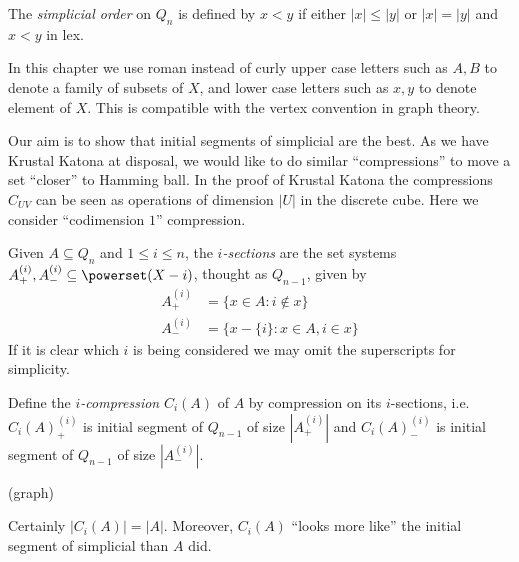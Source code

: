 \documentclass[a4paper]{article}
\begin{document}
\begin{definition}
  The \emph{simplicial order} on \(Q_n\) is defined by \(x < y\) if either \(|x| \leq |y|\) or \(|x| = |y|\) and \(x < y\) in lex.
\end{definition}

\begin{notation}
  In this chapter we use roman instead of curly upper case letters such as \(A, B\) to denote a family of subsets of \(X\), and lower case letters such as \(x, y\) to denote element of \(X\). This is compatible with the vertex convention in graph theory.
\end{notation}

Our aim is to show that initial segments of simplicial are the best. As we have Krustal Katona at disposal, we would like to do similar ``compressions'' to move a set ``closer'' to Hamming ball. In the proof of Krustal Katona the compressions \(C_{UV}\) can be seen as operations of dimension \(|U|\) in the discrete cube. Here we consider ``codimension \(1\)'' compression.

\begin{definition}[section]
  Given \(A \subseteq Q_n\) and \(1 \leq i \leq n\), the \emph{\(i\)-sections} are the set systems \(A^{(i)}_+, A^{(i)}_- \subseteq \powerset(X - i)\), thought as \(Q_{n - 1}\), given by
  \begin{align*}
    A^{(i)}_+ &= \{x \in A: i \notin x\} \\
    A^{(i)}_- &= \{x - \{i\}: x \in A, i \in x\}
  \end{align*}
  If it is clear which \(i\) is being considered we may omit the superscripts for simplicity.
\end{definition}

\begin{definition}[\(i\)-compression]
  Define the \emph{\(i\)-compression} \(C_i(A)\) of \(A\) by compression on its \(i\)-sections, i.e.\ \(C_i(A)^{(i)}_+\) is initial segment of \(Q_{n - 1}\) of size \(|A^{(i)}_+|\) and \(C_i(A)^{(i)}_-\) is initial segment of \(Q_{n - 1}\) of size \(|A^{(i)}_-|\).
\end{definition}

\begin{eg}
  (graph)
\end{eg}

Certainly \(|C_i(A)| = |A|\). Moreover, \(C_i(A)\) ``looks more like'' the initial segment of simplicial than \(A\) did.
\end{document}
